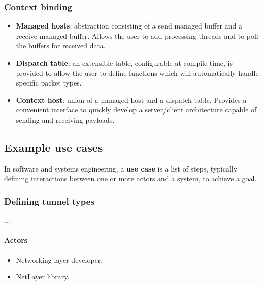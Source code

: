\documentclass[12pt]{report}
\renewcommand\emph{\textbf}
\begin{document}

                \subsubsection{Context binding}
                 \begin{itemize}
                        \item \emph{Managed hosts}: abstraction consisting of a send managed buffer and a receive managed buffer. Allows the user to add processing threads and to poll the buffers for received data.
                        \item \emph{Dispatch table}: an extensible table, configurable at compile-time, is provided to allow the user to define functions which will automatically handle specific packet types.
                        \item \emph{Context host}: union of a managed host and a dispatch table. Provides a convenient interface to quickly develop a server/client architecture capable of sending and receiving payloads.
                    \end{itemize}

            \newpage

            \subsection{Example use cases}
                In software and systems engineering, a \emph{use case} is a list of steps, typically defining interactions between one or more actors and a system, to achieve a goal.

                \subsubsection{Defining tunnel types}
                    ...
                    \paragraph{Actors}
                        \begin{itemize}
                            \item Networking layer developer.
                            \item NetLayer library.
                        \end{itemize}
\end{document}
